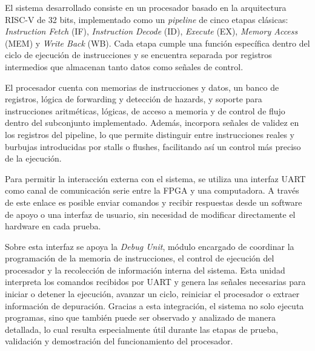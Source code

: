 El sistema desarrollado consiste en un procesador basado en la arquitectura RISC-V de 32 bits, implementado como un \textit{pipeline} de cinco etapas clásicas: \textit{Instruction Fetch} (IF), \textit{Instruction Decode} (ID), \textit{Execute} (EX), \textit{Memory Access} (MEM) y \textit{Write Back} (WB). Cada etapa cumple una función específica dentro del ciclo de ejecución de instrucciones y se encuentra separada por registros intermedios que almacenan tanto datos como señales de control.

El procesador cuenta con memorias de instrucciones y datos, un banco de registros, lógica de forwarding y detección de hazards, y soporte para instrucciones aritméticas, lógicas, de acceso a memoria y de control de flujo dentro del subconjunto implementado. Además, incorpora señales de validez en los registros del pipeline, lo que permite distinguir entre instrucciones reales y burbujas introducidas por stalls o flushes, facilitando así un control más preciso de la ejecución.

Para permitir la interacción externa con el sistema, se utiliza una interfaz UART como canal de comunicación serie entre la FPGA y una computadora. A través de este enlace es posible enviar comandos y recibir respuestas desde un software de apoyo o una interfaz de usuario, sin necesidad de modificar directamente el hardware en cada prueba.

Sobre esta interfaz se apoya la \textit{Debug Unit}, módulo encargado de coordinar la programación de la memoria de instrucciones, el control de ejecución del procesador y la recolección de información interna del sistema. Esta unidad interpreta los comandos recibidos por UART y genera las señales necesarias para iniciar o detener la ejecución, avanzar un ciclo, reiniciar el procesador o extraer información de depuración. Gracias a esta integración, el sistema no solo ejecuta programas, sino que también puede ser observado y analizado de manera detallada, lo cual resulta especialmente útil durante las etapas de prueba, validación y demostración del funcionamiento del procesador.